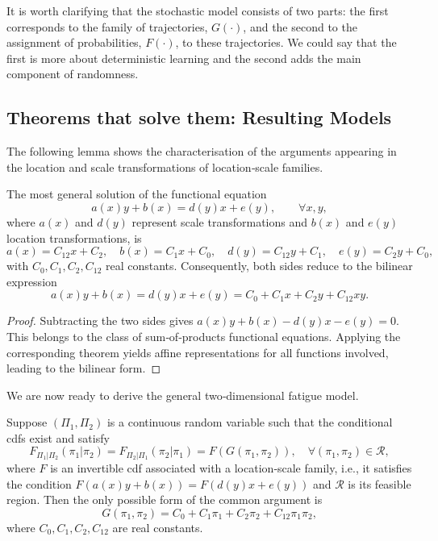 It is worth clarifying that the stochastic model consists of two parts: the first corresponds to the family of trajectories, $G(\cdot)$, and the second to the assignment of probabilities, $F(\cdot)$, to these trajectories. We could say that the first is more about deterministic learning and the second adds the main component of randomness.

\subsection{Theorems that solve them: Resulting Models}

The following lemma shows the characterisation of the arguments appearing in the location and scale transformations of location‑scale families.

\begin{lemma}
\label{lem:bilinear}
The most general solution of the functional equation
\begin{equation}
a(x)y+b(x)=d(y)x+e(y), \qquad \forall x,y,
\label{eq:functionalequation}
\end{equation}
where $a(x)$ and $d(y)$ represent scale transformations and $b(x)$ and $e(y)$ location transformations, is
\begin{equation}
a(x)=C_{12}x+C_2,\quad b(x)=C_1x+C_0,\quad d(y)=C_{12}y+C_1,\quad e(y)=C_2y+C_0,
\end{equation}
with $C_0, C_1, C_2, C_{12}$ real constants. Consequently, both sides reduce to the bilinear expression
\begin{equation}
\boxed{a(x)y+b(x)=d(y)x+e(y) = C_0 + C_1x + C_2y + C_{12}xy.}
\label{eq:bilinearform}
\end{equation}
\end{lemma}

\begin{proof}
Subtracting the two sides gives $a(x)y+b(x)-d(y)x-e(y)=0$. This belongs to the class of sum‑of‑products functional equations. Applying the corresponding theorem yields affine representations for all functions involved, leading to the bilinear form.
\end{proof}

We are now ready to derive the general two‑dimensional fatigue model.

\begin{theorem}
\label{thm:2Dmodel}
Suppose $(\Pi_1,\Pi_2)$ is a continuous random variable such that the conditional cdfs exist and satisfy
\begin{equation}
F_{\Pi_1|\Pi_2}(\pi_1|\pi_2)
=
F_{\Pi_2|\Pi_1}(\pi_2|\pi_1)
=
F\!\left(G(\pi_1,\pi_2)\right), \quad \forall (\pi_1,\pi_2) \in \mathcal{R},
\label{eq:conditionalmodel}
\end{equation}
where $F$ is an invertible cdf associated with a location‑scale family, i.e., it satisfies the condition $F(a(x)y+b(x)) = F(d(y)x+ e(y))$ and $\mathcal{R}$ is its feasible region. Then the only possible form of the common argument is
\begin{equation}
G(\pi_1,\pi_2)
=
C_0+C_1\pi_1+C_2\pi_2+C_{12}\pi_1\pi_2,
\label{eq:generalbilinear}
\end{equation}
where $C_0,C_1,C_2,C_{12}$ are real constants.
\end{theorem}

